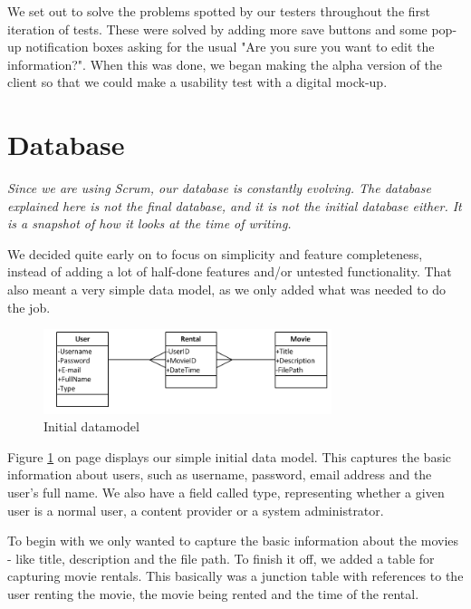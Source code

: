 We set out to solve the problems spotted by our testers throughout the first iteration of tests. These were solved by adding more save buttons and some pop-up notification boxes asking for the usual "Are you sure you want to edit the information?". When this was done, we began making the alpha version of the client so that we could make a usability test with a digital mock-up.

\section{Database}
\label{Design_Database}
\emph{Since we are using Scrum, our database is constantly evolving. The database explained here is not the final database, and it is not the initial database either. It is a snapshot of how it looks at the time of writing.}

We decided quite early on to focus on simplicity and feature completeness, instead of adding a lot of half-done features and/or untested functionality. That also meant a very simple data model, as we only added what was needed to do the job.

\begin{figure}[h!]  
  \caption{Initial datamodel}
\label{fig:Design_Database_initial}
  \centering
    \includegraphics[width=0.75\textwidth]{Images/Datamodel_Initial}
\end{figure}

Figure \ref{fig:Design_Database_initial} on page \pageref{fig:Design_Database_initial} displays our simple initial data model. This captures the basic information about users, such as username, password, email address and the user's full name. We also have a field called type, representing whether a given user is a normal user, a content provider or a system administrator.

To begin with we only wanted to capture the basic information about the movies - like title, description and the file path. To finish it off, we added a table for capturing movie rentals. This basically was a junction table with references to the user renting the movie, the movie being rented and the time of the rental.

